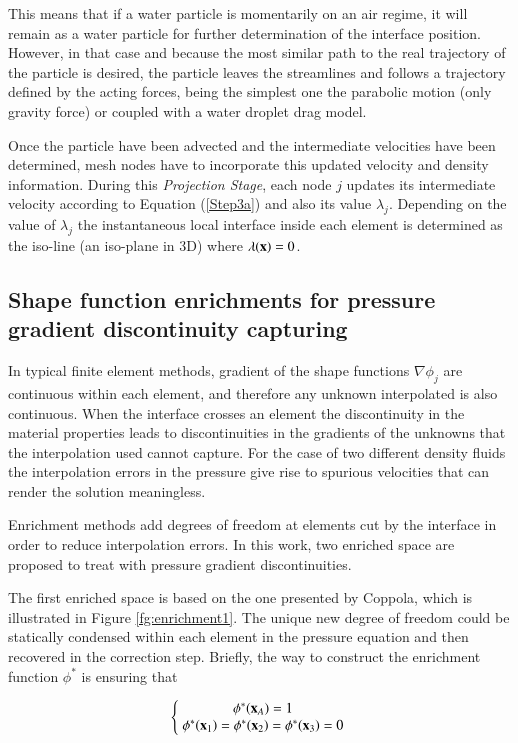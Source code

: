 This means that if a water particle is momentarily on an air regime, it will remain as a water particle for further determination of the interface position. However, in that case and because the most similar path to the real trajectory of the particle is desired, the particle leaves the streamlines and follows a trajectory defined by the acting forces, being the simplest one the parabolic motion (only gravity force) or coupled with a water droplet drag model.

Once the particle have been advected and the intermediate velocities have been determined, mesh nodes have to incorporate this updated velocity and density information. During this \textit{Projection Stage}, each node $j$ updates its intermediate velocity according to Equation (\ref{Step3a}) and also its value $\lambda_j$. Depending on the value of $\lambda_j$ the instantaneous local interface inside each element is determined as the iso-line (an iso-plane in 3D) where $\lambda(\mathbf{x})=0$.

\subsection{Shape function enrichments for pressure gradient discontinuity capturing}

In typical finite element methods, gradient of the shape functions $\nabla\phi_j$ are continuous within each element, and therefore any unknown interpolated is also continuous. When the interface crosses an element the discontinuity in the material properties leads to discontinuities in the gradients of the unknowns that the interpolation used cannot capture. For the case of two different density fluids the interpolation errors in the pressure give rise to spurious velocities that can render the solution meaningless.

Enrichment methods add degrees of freedom at elements cut by the interface in order to reduce interpolation errors. In this work, two enriched space are proposed to treat with pressure gradient discontinuities. 

The first enriched space is based on the one presented by Coppola\cite{Coppola05}, which is illustrated in Figure \ref{fg:enrichment1}. The unique new degree of freedom could be statically condensed within each element in the pressure equation and then recovered in the correction step. Briefly, the way to construct the enrichment function $\phi^*$ is ensuring that

\begin{equation}
   \left\{\;
   \begin{matrix}
      \phi^*(\mathbf{x}_A)= 1 \\
      \phi^*(\mathbf{x}_1)= \phi^*(\mathbf{x}_2)=\phi^*(\mathbf{x}_3)= 0
   \end{matrix}\;
   \right.
   \label{eq:enrich-1a}
\end{equation}

